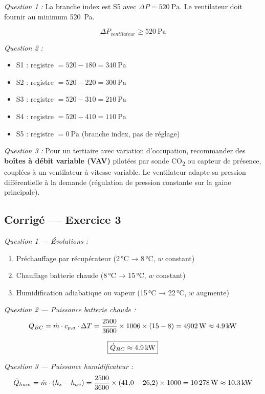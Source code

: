 \textit{Question 1 :} La branche index est S5 avec $\Delta P = \SI{520}{\pascal}$. Le ventilateur doit fournir au minimum \SI{520}{\pascal}.

\[
  \boxed{\Delta P_{ventilateur} \geq \SI{520}{\pascal}}
\]

\textit{Question 2 :}
\begin{itemize}
  \item S1 : registre $= 520 - 180 = \SI{340}{\pascal}$
  \item S2 : registre $= 520 - 220 = \SI{300}{\pascal}$
  \item S3 : registre $= 520 - 310 = \SI{210}{\pascal}$
  \item S4 : registre $= 520 - 410 = \SI{110}{\pascal}$
  \item S5 : registre $= \SI{0}{\pascal}$ (branche index, pas de réglage)
\end{itemize}

\textit{Question 3 :} Pour un tertiaire avec variation d'occupation, recommander des \textbf{boîtes à débit variable (VAV)} pilotées par sonde CO\textsubscript{2} ou capteur de présence, couplées à un ventilateur à vitesse variable. Le ventilateur adapte sa pression différentielle à la demande (régulation de pression constante sur la gaine principale).


\subsection*{Corrigé — Exercice 3}

\textit{Question 1 — Évolutions :}
\begin{enumerate}
  \item Préchauffage par récupérateur (2\,°C → 8\,°C, $w$ constant)
  \item Chauffage batterie chaude (8\,°C → 15\,°C, $w$ constant)
  \item Humidification adiabatique ou vapeur (15\,°C → 22\,°C, $w$ augmente)
\end{enumerate}

\textit{Question 2 — Puissance batterie chaude :}
\[
  \dot{Q}_{BC} = \dot{m} \cdot c_{p,a} \cdot \Delta T = \frac{2500}{3600} \times 1006 \times (15 - 8) = \SI{4902}{\watt} \approx \SI{4{,}9}{\kilo\watt}
\]

\[
  \boxed{\dot{Q}_{BC} \approx \SI{4{,}9}{\kilo\watt}}
\]

\textit{Question 3 — Puissance humidificateur :}
\[
  \dot{Q}_{hum} = \dot{m} \cdot (h_s - h_{av}) = \frac{2500}{3600} \times (41{,}0 - 26{,}2) \times 1000 = \SI{10\,278}{\watt} \approx \SI{10{,}3}{\kilo\watt}
\]

